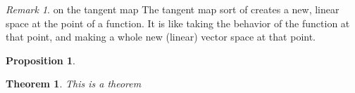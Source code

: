 \documentclass[12pt]{article}
\newtheorem{theorem}{Theorem}[section]
\newtheorem{proposition}{Proposition}[theorem]
\theoremstyle{definition}
\theoremstyle{remark}
\newtheorem*{remark}{Remark}
\begin{document}
\begin{remark}{on the tangent map}
The tangent map sort of creates a new, linear space at the point of a function. It is like taking the behavior of the function at that point, and making a whole new (linear) vector space at that point.
\end{remark}

\begin{proposition}

\end{proposition}

\begin{theorem}
This is a theorem
\end{theorem}
\end{document}
